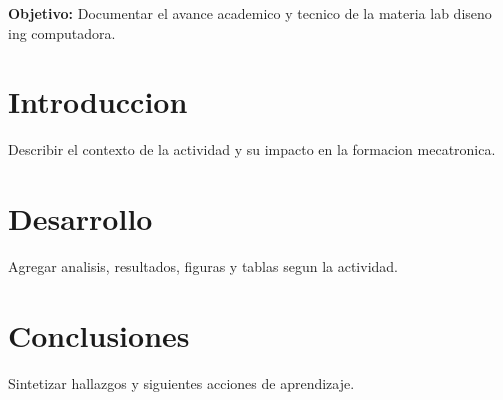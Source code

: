 \documentclass[spanish,letterpaper,oneside]{article}
\begin{document}
\templatePortrait
\templatePagecfg
\onehalfspacing

\begin{abstractd}
\textbf{Objetivo:} Documentar el avance academico y tecnico de la materia lab diseno ing computadora.
\end{abstractd}

\templateIndex
\templateFinalcfg

\section{Introduccion}
Describir el contexto de la actividad y su impacto en la formacion mecatronica.

\section{Desarrollo}
Agregar analisis, resultados, figuras y tablas segun la actividad.

\section{Conclusiones}
Sintetizar hallazgos y siguientes acciones de aprendizaje.



\end{document}
